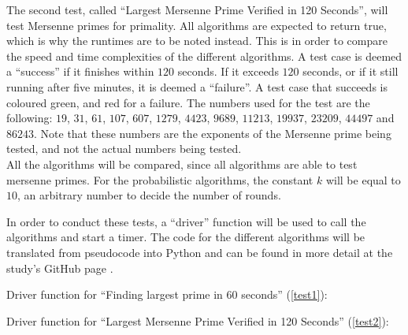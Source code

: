 \documentclass[main.tex]{subfiles}
\begin{document}
The second test, called ``Largest Mersenne Prime Verified in 120 Seconds'', will
test Mersenne primes for primality. All algorithms are expected to return true,
which is why the runtimes are to be noted instead. This is in order to compare
the speed and time complexities of the different algorithms. A test case is
deemed a ``success'' if it finishes within $120$ seconds. If it exceeds $120$
seconds, or if it still running after five minutes, it is deemed a ``failure''.
A test case that succeeds is coloured green, and red for a failure. The numbers
used for the test are the following: $19$, $31$, $61$, $107$, $607$, $1279$,
$4423$, $9689$, $11213$, $19937$, $23209$, $44497$ and $86243$. Note that these
numbers are the exponents of the Mersenne prime being tested, and not
the actual numbers being tested. \\

All the algorithms will be compared, since all algorithms are able to test
mersenne primes. For the probabilistic algorithms, the constant $k$ will be
equal to $10$, an arbitrary number to decide the number of rounds. \newline

In order to conduct these tests, a ``driver'' function will be used to call the
algorithms and start a timer. The code for the different algorithms will be
translated from pseudocode into Python and can be found in more detail at the
study's GitHub page \cite{github}.

\newpage

Driver function for ``Finding largest prime in 60 seconds'' (\ref{test1}):



\newpage

Driver function for ``Largest Mersenne Prime Verified in 120 Seconds''
(\ref{test2}):


\end{document}
